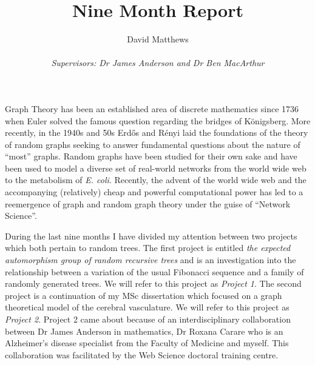 \documentclass[12pt]{article} %
\title{Nine Month Report}
\author{David Matthews \\\\\emph{Supervisors: Dr James Anderson and Dr Ben MacArthur}}
\theoremstyle{definition}
\begin{document}
 
\maketitle
 
Graph Theory has been an established area of discrete mathematics since 1736 when Euler solved the famous question regarding the bridges of K\"{o}nigsberg.  More recently, in the 1940s and 50s Erd\H{o}s and R\'{e}nyi laid the foundations of the theory of random graphs seeking to answer fundamental questions about the nature of ``most'' graphs. Random graphs have been studied for their own sake and have been used to model a diverse set of real-world networks from the world wide web to the metabolism of \emph{E. coli}. Recently, the advent of the world wide web and the accompanying %
(relatively) cheap and powerful computational power has led to a reemergence of graph and random graph theory under the guise of ``Network Science''. 
  
During the last nine months I have divided my attention between two projects which both pertain to random trees.  The first project is entitled \emph{the expected automorphism group of random recursive trees} and is an investigation into the relationship between a variation of the usual Fibonacci sequence and a family of randomly generated trees. We will refer to this project as \emph{Project 1}. The second project is a continuation of my MSc dissertation which focused on a graph theoretical model of the cerebral vasculature.  We will refer to this project as \emph{Project 2}. Project 2 came about because of an interdisciplinary collaboration between Dr James Anderson in mathematics, Dr Roxana Carare who is an Alzheimer's disease specialist from the Faculty of Medicine and myself.  This collaboration was facilitated by the Web Science doctoral training centre. 

\end{document}
